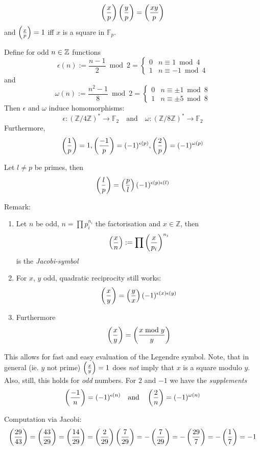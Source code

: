 \begin{remark}
$$\left(\frac{x}{p}\right) \left(\frac{y}{p}\right) = \left(\frac{xy}{p}\right)$$
and
$\left(\frac{x}{p}\right) = 1$ iff $x$ is a square in $\mathbb F_p$.
\end{remark}
\begin{theorem}
Define for odd $n\in {\mathbb Z}$ functions 
$$\epsilon(n) := \frac{n-1} 2 \bmod 2 = \begin{cases} 0 & n\equiv 1 \bmod 4\\
                                                      1 & n \equiv -1 \bmod 4
                                                      \end{cases}$$
and
$$\omega(n) := \frac{n^2-1} 8 \bmod 2 = \begin{cases} 0 & n \equiv \pm 1 \bmod 8\\
                                                      1 & n \equiv \pm 5 \bmod 8
                                                      \end{cases}$$
Then $\epsilon$ and $\omega$ induce homomorphisms:
$$\epsilon : (\mathbb Z/4\mathbb Z)^* \to \mathbb F_2\quad\text{and}\quad
\omega: (\mathbb Z/8\mathbb Z)^* \to \mathbb F_2$$
Furthermore, 
$$\left(\frac{1}{p}\right) = 1, \left(\frac{-1}{p}\right) = (-1)^{\epsilon(p)}, \left(\frac{2}{p}\right) = (-1)^{\omega(p)}$$
\end{theorem}
\begin{theorem}
Let $l\ne p$ be primes, then 
$$\left(\frac{l}{p}\right) = \left(\frac{p}{l}\right) (-1)^{\epsilon(p)\epsilon(l)}$$
\end{theorem}
Remark:
\begin{enumerate}
  \item Let $n$ be odd, $n=\prod p_i^{n_i}$ the factorisation and $x\in\mathbb Z$, then
    $$\left(\frac{x}{n}\right) := \prod \left(\frac{x}{p_i}\right) ^{n_i}$$
    is the {\em Jacobi-symbol}
  \item For $x$, $y$ odd, quadratic reciprocity still works:
    $$\left(\frac{x}{y}\right) = \left(\frac{y}{x}\right) (-1)^{\epsilon(x)\epsilon(y)}$$
  \item Furthermore 
    $$\left(\frac{x}{y}\right) = \left(\frac{x\bmod y}{y}\right)$$
\end{enumerate}
This allows for fast and easy evaluation of the Legendre symbol.
Note, that in general (ie. $y$ not prime) $\left(\frac{x}{y}\right) = 1$ does {\em not}
imply that $x$ is a square modulo $y$. Also, still, this holds for {\em odd}
numbers.
For $2$ and $-1$ we have the {\em supplements}
$$\left(\frac{-1}{n}\right) = (-1)^{\epsilon(n)}\quad\text{and}\quad\left(\frac{2}{n}\right) = (-1)^{\omega(n)}$$
\begin{remark}
Computation via Jacobi:
  $$\left(\frac{29}{43}\right) = \left(\frac{43}{29}\right) = \left(\frac{14}{29}\right) = \left(\frac{2}{29}\right)\left(\frac{7}{29}\right) = - \left(\frac{7}{29}\right) = -\left(\frac{29}{7}\right) = -\left(\frac{1}{7}\right) = -1$$
\end{remark}
